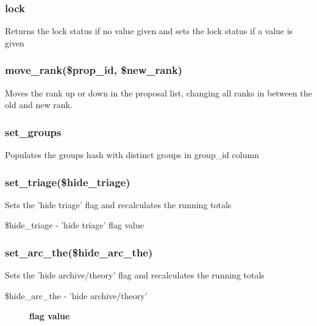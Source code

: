 \documentclass{article}
\begin{document}
\subsubsection*{lock\label{Panel_lock}}


Returns the lock status if no value given and sets the lock status if a value
is given

\subsubsection*{move\_rank(\$prop\_id, \$new\_rank)\label{Panel_move_rank_prop_id_new_rank_}}


Moves the rank up or down in the proposal list, changing all ranks in between 
the old and new rank.

\subsubsection*{set\_groups\label{Panel_set_groups}}


Populates the groups hash with distinct groups in group\_id column

\subsubsection*{set\_triage(\$hide\_triage)\label{Panel_set_triage_hide_triage_}}


Sets the 'hide triage' flag and recalculates the running totals

\begin{description}

\item[{\$hide\_triage - 'hide triage' flag value}] \mbox{}\end{description}
\subsubsection*{set\_arc\_the(\$hide\_arc\_the)\label{Panel_set_arc_the_hide_arc_the_}}


Sets the 'hide archive/theory' flag and recalculates the running totals

\begin{description}

\item[{\$hide\_arc\_the - 'hide archive/theory'}] \textbf{flag value}\end{description}
\end{document}
